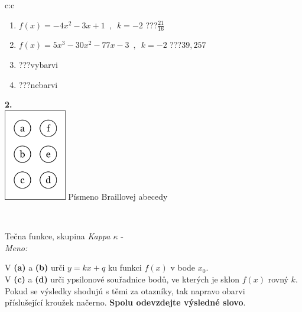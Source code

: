 \documentclass[10pt]{report}
\begin{document}
\begin{tabular}{c:c}
\begin{minipage}[c][104.5mm][t]{0.5\linewidth}
\begin{center}
\begin{minipage}{0.79\linewidth}
\begin{center}
\begin{varwidth}{\linewidth}
\begin{enumerate}
\item $f(x)=-4x^2-3x+1\enspace , \enspace k=-2$\quad \dotfill\; ???\;\dotfill \quad $\frac{21}{16}$
\item $f(x)=5x^3-30x^2-77x-3\enspace , \enspace k=-2$\quad \dotfill\; ???\;\dotfill \quad $39 , 257$
\item \quad \dotfill\; ???\;\dotfill \quad vybarvi
\item \quad \dotfill\; ???\;\dotfill \quad nebarvi
\end{enumerate}
\end{varwidth}
\end{center}
\end{minipage}
\begin{minipage}{0.20\linewidth}
\begin{center}
{\Huge\bfseries 2.} \\[2mm]
\includegraphics[height=40mm]{../images/braille.png}
{\small Písmeno Braillovej abecedy}
\end{center}
\end{minipage}
\end{center}
\end{minipage}
\\ \hdashline
\begin{minipage}[c][104.5mm][t]{0.5\linewidth}
\begin{center}
\vspace{7mm}
{\huge Tečna funkce, skupina \textit{Kappa $\kappa$} -}\\[5mm]
\textit{Meno:}\phantom{xxxxxxxxxxxxxxxxxxxxxxxxxxxxxxxxxxxxxxxxxxxxxxxxxxxxxxxxxxxxxxxxx}\\[5mm]
\begin{minipage}{0.95\linewidth}
\begin{center}
V \textbf{(a)} a \textbf{(b)} urči  $y = kx + q$ ku funkci $f(x)$ v bode $x_0$.\\V \textbf{(c)} a \textbf{(d)} urči ypsilonové souřadnice bodů, ve kterých je sklon $f(x)$ rovný $k$.\\Pokud se výsledky shodujú s těmi za otazníky, tak napravo obarvi\\příslušející kroužek načerno. \textbf{Spolu odevzdejte výsledné slovo}.

\end{center}
\end{minipage}
\end{center}
\end{minipage}
\end{tabular}
\end{document}
